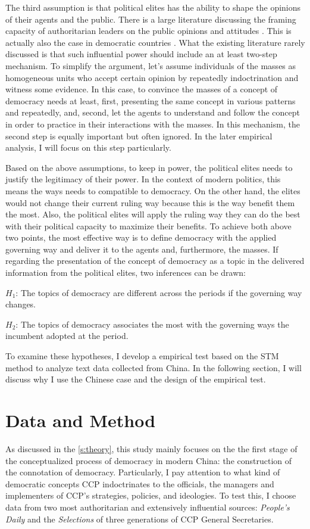 \documentclass[abstracton,UTF8]{ctexart}
\begin{document}
The third assumption is that political elites has the ability to shape the opinions of their agents and the public. There is a large literature discussing the framing capacity of authoritarian leaders on the public opinions and attitudes \citep{Miller1979,Patterson1999,Chan1997,Jiang2015}. This is actually also the case in democratic countries \citep{Sniderman2004,Chong2007}. What the existing literature rarely discussed is that such influential power should include an at least two-step mechanism. To simplify the argument, let's assume individuals of the masses as homogeneous units who accept certain opinion by repeatedly indoctrination and witness some evidence. In this case, to convince the masses of a concept of democracy needs at least, first, presenting the same concept in various patterns and repeatedly, and, second, let the agents to understand and follow the concept in order to practice in their interactions with the masses. In this mechanism, the second step is equally important but often ignored. In the later empirical analysis, I will focus on this step particularly.

Based on the above assumptions, to keep in power, the political elites needs to justify the legitimacy of their power. In the context of modern politics, this means the ways needs to compatible to democracy. On the other hand, the elites would not change their current ruling way because this is the way benefit them the most. Also, the political elites will apply the ruling way they can do the best with their political capacity to maximize their benefits. To achieve both above two points, the most effective way is to define democracy with the applied governing way and deliver it to the agents and, furthermore, the masses. If regarding the presentation of the concept of democracy as a topic in the delivered information from the political elites, two inferences can be drawn:

$H_1$: The topics of democracy are different across the periods if the governing way changes.

$H_2$: The topics of democracy associates the most with the governing ways the incumbent adopted at the period.

To examine these hypotheses, I develop a empirical test based on the STM method to analyze text data collected from China. In the following section, I will discuss why I use the Chinese case and the design of the empirical test.

\section{Data and Method}
As discussed in the \cref{s:theory}, this study mainly focuses on the the first stage of the conceptualized process of democracy in modern China: the construction of the connotation of democracy. Particularly, I pay attention to what kind of democratic concepts CCP indoctrinates to the officials, the managers and implementers of CCP's strategies, policies, and ideologies. To test this, I choose data from two most authoritarian and extensively influential sources: \textit{People's Daily} and the \textit{Selections} of three generations of CCP General Secretaries. 
\end{document}
